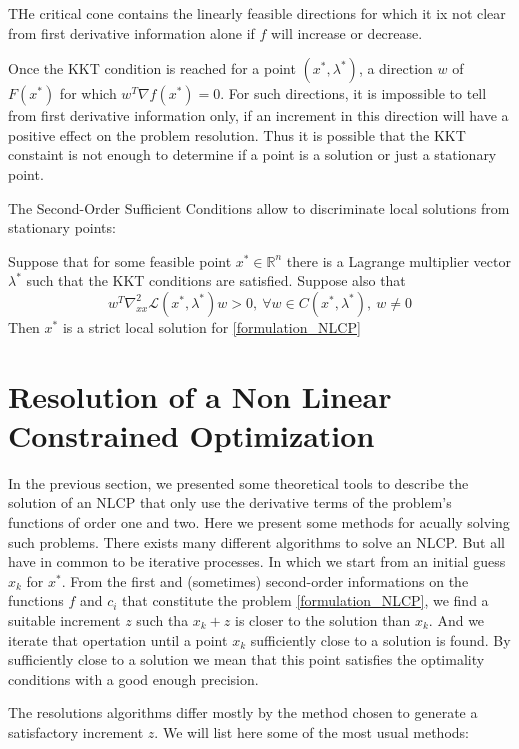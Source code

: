 THe critical cone contains the linearly feasible directions for which it ix not clear from first derivative information alone if $f$ will increase or decrease.

Once the KKT condition is reached for a point $(x^*, \lambda^*)$, a direction $w$ of $F(x^*)$ for which $w^T\nabla f(x^*)=0$.
For such directions, it is impossible to tell from first derivative information only, if an increment in this direction will have a positive effect on the problem resolution.
Thus it is possible that the KKT constaint is not enough to determine if a point is a solution or just a stationary point.

The Second-Order Sufficient Conditions allow to discriminate local solutions from stationary points:

\begin{theorem}
  Suppose that for some feasible point $x^*\in \mathbb{R}^n$ there is a Lagrange multiplier vector $\lambda^*$ such that the KKT conditions are satisfied. Suppose also that
  \begin{equation}
    w^T\nabla_{xx}^2\mathcal{L}(x^*,\lambda^*)w>0,\ \forall w\in C(x^*,\lambda^*),\ w\neq 0
  \end{equation}
  Then $x^*$ is a strict local solution for \ref{formulation_NLCP}
\end{theorem}

\section{Resolution of a Non Linear Constrained Optimization}

In the previous section, we presented some theoretical tools to describe the solution of an NLCP that only use the derivative terms of the problem's functions of order one and two.
Here we present some methods for acually solving such problems.
There exists many different algorithms to solve an NLCP.
But all have in common to be iterative processes.
In which we start from an initial guess $x_k$ for $x^*$.
From the first and (sometimes) second-order informations on the functions $f$ and $c_i$ that constitute the problem \ref{formulation_NLCP}, we find a suitable increment $z$ such tha $x_k+z$ is closer to the solution than $x_k$.
And we iterate that opertation until a point $x_k$ sufficiently close to a solution is found.
By sufficiently close to a solution we mean that this point satisfies the optimality conditions with a good enough precision.

The resolutions algorithms differ mostly by the method chosen to generate a satisfactory increment $z$. We will list here some of the most usual methods:

